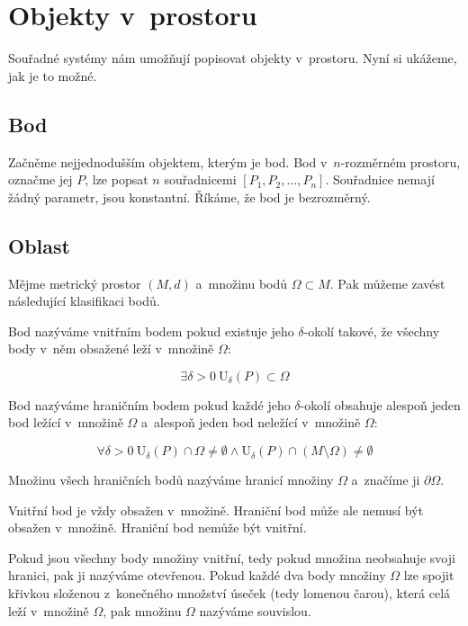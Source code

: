 \chapter{Objekty v~prostoru}

Souřadné systémy nám umožňují popisovat objekty v~prostoru. Nyní si ukážeme, jak je to možné. 

\section{Bod}

Začněme nejjednodušším objektem, kterým je bod. Bod v~\(n\)-rozměrném prostoru, označme jej \(P\), lze popsat \(n\) souřadnicemi \([P_1, P_2, ..., P_n]\). Souřadnice nemají žádný parametr, jsou konstantní. Říkáme, že bod je bezrozměrný.

\section{Oblast}

Mějme metrický prostor \((M, d)\) a~množinu bodů \(\Omega \subset M\). Pak můžeme zavést následující klasifikaci bodů.

Bod nazýváme vnitřním bodem pokud existuje jeho \(\delta\)-okolí takové, že všechny body v~něm obsažené leží v~množině \(\Omega\):

\begin{equation}
\exists \delta > 0 \ \mathrm{U}_{\delta}(P) \subset \Omega
\end{equation}

Bod nazýváme hraničním bodem pokud každé jeho \(\delta\)-okolí obsahuje alespoň jeden bod ležící v~množině \(\Omega\) a~alespoň jeden bod neležící v~množině \(\Omega\):

\begin{equation}
\forall \delta > 0 \ \mathrm{U}_{\delta}(P) \cap \Omega \neq \emptyset \land \mathrm{U}_{\delta}(P) \cap (M \setminus \Omega) \neq \emptyset
\end{equation}

Množinu všech hraničních bodů nazýváme hranicí množiny \(\Omega\) a~značíme ji \(\partial \Omega\).

Vnitřní bod je vždy obsažen v~množině. Hraniční bod může ale nemusí být obsažen v~množině. Hraniční bod nemůže být vnitřní.

Pokud jsou všechny body množiny vnitřní, tedy pokud množina neobsahuje svoji hranici, pak ji nazýváme otevřenou. Pokud každé dva body množiny \(\Omega\) lze spojit křivkou složenou z~konečného množství úseček (tedy lomenou čarou), která celá leží v~množině \(\Omega\), pak množinu \(\Omega\) nazýváme souvislou.  

